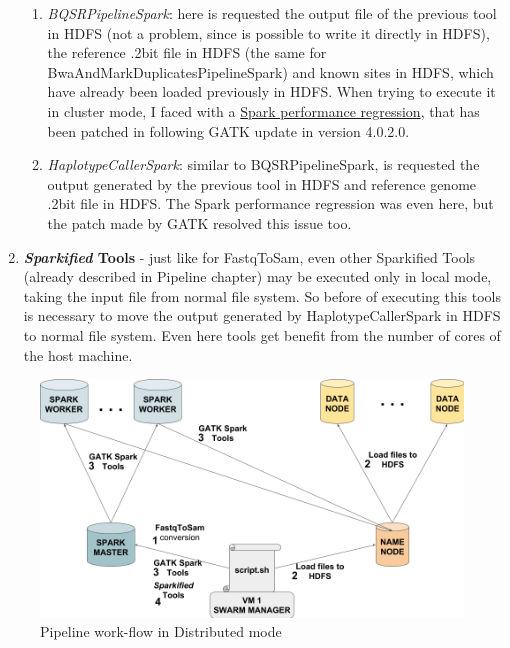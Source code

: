 \begin{enumerate}
\begin{enumerate}
    \item \textit{BQSRPipelineSpark}: here is requested the output file of the previous tool in HDFS (not a problem, since is possible to write it directly in HDFS), the reference .2bit file in HDFS (the same for BwaAndMarkDuplicatesPipelineSpark) and known sites in HDFS, which have already been loaded previously in HDFS. When trying to execute it in cluster mode, I faced with a \href{https://github.com/broadinstitute/gatk/issues/4376}{Spark performance regression}, that has been patched in following GATK update in version 4.0.2.0.
    \item \textit{HaplotypeCallerSpark}: similar to BQSRPipelineSpark, is requested the output generated by the previous tool in HDFS and reference genome .2bit file in HDFS. The Spark performance regression was even here, but the patch made by GATK resolved this issue too.
  \end{enumerate}
  \item \textbf{\textit{Sparkified} Tools} - just like for FastqToSam, even other Sparkified Tools (already described in Pipeline chapter) may be executed only in local mode, taking the input file from normal file system. So before of executing this tools is necessary to move the output generated by HaplotypeCallerSpark in HDFS to normal file system. Even here tools get benefit from the number of cores of the host machine.
\end{enumerate}


\begin{figure}[h] 
\begin{center}
\includegraphics[scale=0.45]{figure/distributed_pipeline.png}
\end{center}
\caption{Pipeline work-flow in Distributed mode ~\label{distributed_pipeline}}
\end{figure}





















